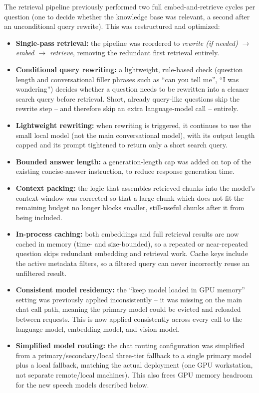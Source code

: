 \documentclass[11pt,a4paper]{article}
\begin{document}
The retrieval pipeline previously performed two full embed-and-retrieve cycles per question (one to decide whether the knowledge base was relevant, a second after an unconditional query rewrite). This was restructured and optimized:

\begin{itemize}
    \item \textbf{Single-pass retrieval:} the pipeline was reordered to \emph{rewrite (if needed) $\rightarrow$ embed $\rightarrow$ retrieve}, removing the redundant first retrieval entirely.
    \item \textbf{Conditional query rewriting:} a lightweight, rule-based check (question length and conversational filler phrases such as ``can you tell me'', ``I was wondering'') decides whether a question needs to be rewritten into a cleaner search query before retrieval. Short, already query-like questions skip the rewrite step -- and therefore skip an extra language-model call -- entirely.
    \item \textbf{Lightweight rewriting:} when rewriting is triggered, it continues to use the small local model (not the main conversational model), with its output length capped and its prompt tightened to return only a short search query.
    \item \textbf{Bounded answer length:} a generation-length cap was added on top of the existing concise-answer instruction, to reduce response generation time.
    \item \textbf{Context packing:} the logic that assembles retrieved chunks into the model's context window was corrected so that a large chunk which does not fit the remaining budget no longer blocks smaller, still-useful chunks after it from being included.
    \item \textbf{In-process caching:} both embeddings and full retrieval results are now cached in memory (time- and size-bounded), so a repeated or near-repeated question skips redundant embedding and retrieval work. Cache keys include the active metadata filters, so a filtered query can never incorrectly reuse an unfiltered result.
    \item \textbf{Consistent model residency:} the ``keep model loaded in GPU memory'' setting was previously applied inconsistently -- it was missing on the main chat call path, meaning the primary model could be evicted and reloaded between requests. This is now applied consistently across every call to the language model, embedding model, and vision model.
    \item \textbf{Simplified model routing:} the chat routing configuration was simplified from a primary/secondary/local three-tier fallback to a single primary model plus a local fallback, matching the actual deployment (one GPU workstation, not separate remote/local machines). This also frees GPU memory headroom for the new speech models described below.
\end{itemize}
\end{document}
